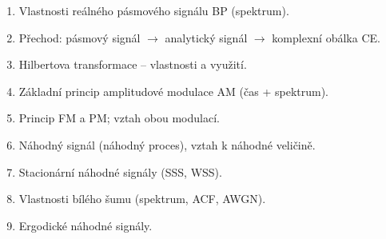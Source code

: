 \documentclass[12pt,a4paper]{article}
\begin{document}
\begin{tcolorbox}[colback=cervena!8,colframe=cervena,
    title={\bfseries\color{white} Seznam všech $\bigstar$ otázek (29)},
    fonttitle=\large]
\begin{enumerate}[itemsep=4pt]
  \item Vlastnosti reálného pásmového signálu BP (spektrum).
  \item Přechod: pásmový signál $\to$ analytický signál $\to$ komplexní obálka CE.
  \item Hilbertova transformace – vlastnosti a využití.
  \item Základní princip amplitudové modulace AM (čas + spektrum).
  \item Princip FM a PM; vztah obou modulací.
  \item Náhodný signál (náhodný proces), vztah k náhodné veličině.
  \item Stacionární náhodné signály (SSS, WSS).
  \item Vlastnosti bílého šumu (spektrum, ACF, AWGN).
  \item Ergodické náhodné signály.
\end{enumerate}
\end{tcolorbox}
\end{document}
